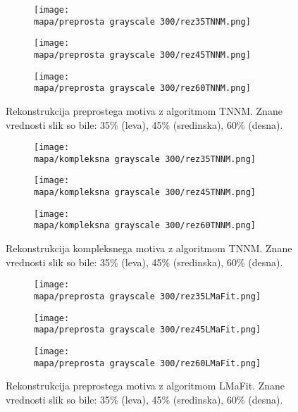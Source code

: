 \begin{figure}[!ht]
    \begin{subfigure}{0.325\linewidth}
        \texttt{[image: \\mapa/preprosta grayscale 300/rez35TNNM.png]}
    \end{subfigure}
    \hfill
    \begin{subfigure}{0.325\linewidth}
        \texttt{[image: \\mapa/preprosta grayscale 300/rez45TNNM.png]}
    \end{subfigure}
    \hfill
    \begin{subfigure}{0.325\linewidth}
        \texttt{[image: \\mapa/preprosta grayscale 300/rez60TNNM.png]}
    \end{subfigure}
    \caption{Rekonstrukcija preprostega motiva z algoritmom TNNM. Znane vrednosti slik so bile: 35\% (leva), 45\% (sredinska), 60\% (desna).}
\end{figure}

\begin{figure}[!ht]
    \begin{subfigure}{0.325\linewidth}
        \texttt{[image: \\mapa/kompleksna grayscale 300/rez35TNNM.png]}
    \end{subfigure}
    \hfill
    \begin{subfigure}{0.325\linewidth}
        \texttt{[image: \\mapa/kompleksna grayscale 300/rez45TNNM.png]}
    \end{subfigure}
    \hfill
    \begin{subfigure}{0.325\linewidth}
        \texttt{[image: \\mapa/kompleksna grayscale 300/rez60TNNM.png]}
    \end{subfigure}
    \caption{Rekonstrukcija kompleksnega motiva z algoritmom TNNM. Znane vrednosti slik so bile: 35\% (leva), 45\% (sredinska), 60\% (desna).}
\end{figure}

\begin{figure}[!ht]
    \begin{subfigure}{0.325\linewidth}
        \texttt{[image: \\mapa/preprosta grayscale 300/rez35LMaFit.png]}
    \end{subfigure}
    \hfill
    \begin{subfigure}{0.325\linewidth}
        \texttt{[image: \\mapa/preprosta grayscale 300/rez45LMaFit.png]}
    \end{subfigure}
    \hfill
    \begin{subfigure}{0.325\linewidth}
        \texttt{[image: \\mapa/preprosta grayscale 300/rez60LMaFit.png]}
    \end{subfigure}
    \caption{Rekonstrukcija preprostega motiva z algoritmom LMaFit. Znane vrednosti slik so bile: 35\% (leva), 45\% (sredinska), 60\% (desna).}
\end{figure}

